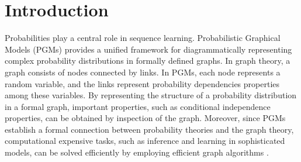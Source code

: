 
\chapter{Introduction}
\label{cha:intro}










Probabilities play a central role in sequence learning.
Probabilistic Graphical Models (PGMs)
\cite{koller2009probabilistic} provides a unified framework for
diagrammatically representing complex probability distributions
in formally defined graphs. In graph theory, a graph consists of
nodes connected by links. In PGMs, each node represents a random
variable, and the links represent probability dependencies
properties among these variables. By representing the structure
of a probability distribution in a formal graph, important
properties, such as conditional independence properties, can be
obtained by inspection of the graph. Moreover, since PGMs
establish a formal connection between probability theories and
the graph theory, computational expensive tasks, such as
inference and learning in sophisticated models, can be solved
efficiently by employing efficient graph algorithms
\cite{Ladicky:ECCV10,Rother:CVPR09,Kohli:TR08}.

